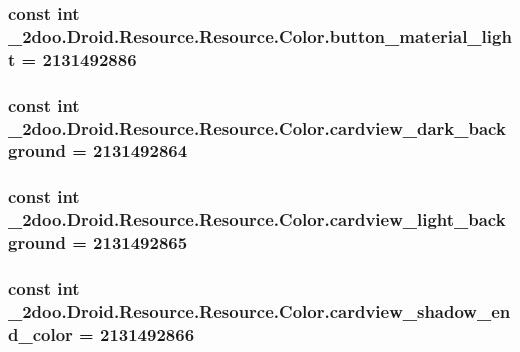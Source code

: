 \hypertarget{class__2doo_1_1_droid_1_1_resource_1_1_color_575be662eb2f6bd3b719bc290db89774}{
\subsubsection[{button\_\-material\_\-light}]{\setlength{\rightskip}{0pt plus 5cm}const int \_\-2doo.Droid.Resource.Resource.Color.button\_\-material\_\-light = 2131492886}}
\label{class__2doo_1_1_droid_1_1_resource_1_1_color_575be662eb2f6bd3b719bc290db89774}


\hypertarget{class__2doo_1_1_droid_1_1_resource_1_1_color_13cf7475c04de9cbfb490956146f212a}{
\subsubsection[{cardview\_\-dark\_\-background}]{\setlength{\rightskip}{0pt plus 5cm}const int \_\-2doo.Droid.Resource.Resource.Color.cardview\_\-dark\_\-background = 2131492864}}
\label{class__2doo_1_1_droid_1_1_resource_1_1_color_13cf7475c04de9cbfb490956146f212a}


\hypertarget{class__2doo_1_1_droid_1_1_resource_1_1_color_f061dd612e47ae30cadca40873b65e6d}{
\subsubsection[{cardview\_\-light\_\-background}]{\setlength{\rightskip}{0pt plus 5cm}const int \_\-2doo.Droid.Resource.Resource.Color.cardview\_\-light\_\-background = 2131492865}}
\label{class__2doo_1_1_droid_1_1_resource_1_1_color_f061dd612e47ae30cadca40873b65e6d}


\hypertarget{class__2doo_1_1_droid_1_1_resource_1_1_color_b3653cc86a4a2baac0d219dd3ce7e4b8}{
\subsubsection[{cardview\_\-shadow\_\-end\_\-color}]{\setlength{\rightskip}{0pt plus 5cm}const int \_\-2doo.Droid.Resource.Resource.Color.cardview\_\-shadow\_\-end\_\-color = 2131492866}}
\label{class__2doo_1_1_droid_1_1_resource_1_1_color_b3653cc86a4a2baac0d219dd3ce7e4b8}


